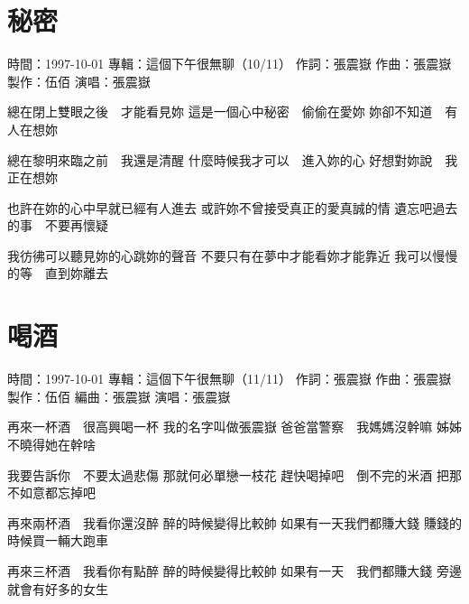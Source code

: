 \documentclass[UTF8,a4paper,oneside,twocolumn,12pt]{ctexbook}
\newcommand{\infopair}[2]{\textbullet #1：#2}
\newcommand{\zc}[1][伍佰]{\infopair{作詞}{#1}}
\newcommand{\zq}[1][伍佰]{\infopair{作曲}{#1}}
\newcommand{\bq}[1][伍佰]{\infopair{編曲}{#1}}
\newcommand{\zj}[1]{\infopair{專輯}{#1}}
\newcommand{\zz}[1]{\infopair{製作}{#1}}
\newcommand{\sj}[1]{\infopair{時間}{#1}}
\newenvironment{info}{\begin{flushleft}\kaishu
	}
	{\end{flushleft}\normalsize\yahei\par}
\newenvironment{lyric}{
	}
{}
\begin{document}
\section{秘密}
\begin{info}
	\sj{1997-10-01}
	\zj{這個下午很無聊（10/11）}
	\zc[張震嶽]
	\zq[張震嶽]
	\zz{伍佰}
	\infopair{演唱}{張震嶽}
\end{info}
\begin{lyric}
	總在閉上雙眼之後　才能看見妳
	這是一個心中秘密　偷偷在愛妳
	妳卻不知道　有人在想妳

	總在黎明來臨之前　我還是清醒
	什麼時候我才可以　進入妳的心
	好想對妳說　我正在想妳

	也許在妳的心中早就已經有人進去
	或許妳不曾接受真正的愛真誠的情
	遺忘吧過去的事　不要再懷疑

	我彷彿可以聽見妳的心跳妳的聲音
	不要只有在夢中才能看妳才能靠近
	我可以慢慢的等　直到妳離去
\end{lyric}

\section{喝酒}
\begin{info}
	\sj{1997-10-01}
	\zj{這個下午很無聊（11/11）}
	\zc[張震嶽]
	\zq[張震嶽]
	\zz{伍佰}
	\bq[張震嶽]
	\infopair{演唱}{張震嶽}
\end{info}
\begin{lyric}
	再來一杯酒　很高興喝一杯
	我的名字叫做張震嶽
	爸爸當警察　我媽媽沒幹嘛
	姊姊不曉得她在幹啥

	我要告訴你　不要太過悲傷
	那就何必單戀一枝花
	趕快喝掉吧　倒不完的米酒
	把那不如意都忘掉吧

	再來兩杯酒　我看你還沒醉
	醉的時候變得比較帥
	如果有一天我們都賺大錢
	賺錢的時候買一輛大跑車

	再來三杯酒　我看你有點醉
	醉的時候變得比較帥
	如果有一天　我們都賺大錢
	旁邊就會有好多的女生
\end{lyric}
\end{document}
